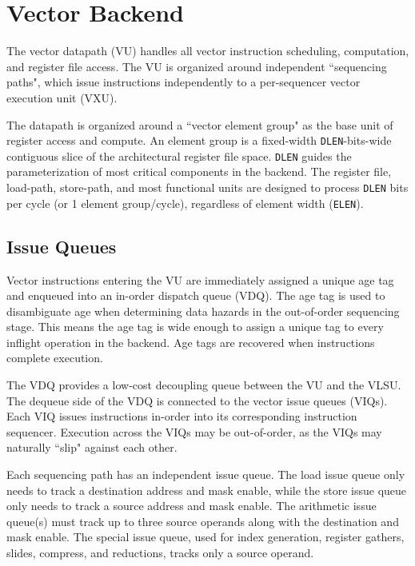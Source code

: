 \newpage
\section{Vector Backend}
\label{sec:execute}


The vector datapath (VU) handles all vector instruction scheduling, computation, and register file access.
The VU is organized around independent ``sequencing paths", which issue instructions independently to a per-sequencer vector execution unit (VXU).

The datapath is organized around a ``vector element group" as the base unit of register access and compute.
An element group is a fixed-width \texttt{DLEN}-bits-wide contiguous slice of the architectural register file space.
\texttt{DLEN} guides the parameterization of most critical components in the backend.
The register file, load-path, store-path, and most functional units are designed to process \texttt{DLEN} bits per cycle (or 1 element group/cycle), regardless of element width (\texttt{ELEN}).

\subsection{Issue Queues}

Vector instructions entering the VU are immediately assigned a unique age tag and enqueued into an in-order dispatch queue (VDQ).
The age tag is used to disambiguate age when determining data hazards in the out-of-order sequencing stage.
This means the age tag is wide enough to assign a unique tag to every inflight operation in the backend.
Age tags are recovered when instructions complete execution.

The VDQ provides a low-cost decoupling queue between the VU and the VLSU.
The dequeue side of the VDQ is connected to the vector issue queues (VIQs).
Each VIQ issues instructions in-order into its corresponding instruction sequencer.
Execution across the VIQs may be out-of-order, as the VIQs may naturally ``slip" against each other.

Each sequencing path has an independent issue queue.
The load issue queue only needs to track a destination address and mask enable, while the store issue queue only needs to track a source address and mask enable.
The arithmetic issue queue(s) must track up to three source operands along with the destination and mask enable.
The special issue queue, used for index generation, register gathers, slides, compress, and reductions, tracks only a source operand.

